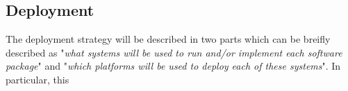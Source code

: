 \documentclass{article}[12pt]
\numberwithin{equation}{section}
\begin{document}
\begin{flushleft}
\newpage



\section{Deployment}
\begin{spacing}{1.5}
	The deployment strategy will be described in two parts which can be breifly described as "\emph{what systems will be used to run and/or implement each software package}" and "\emph{which platforms will be used to deploy each of these systems}".  In particular, this 
\end{spacing}





























































































\end{flushleft}
\end{document}
